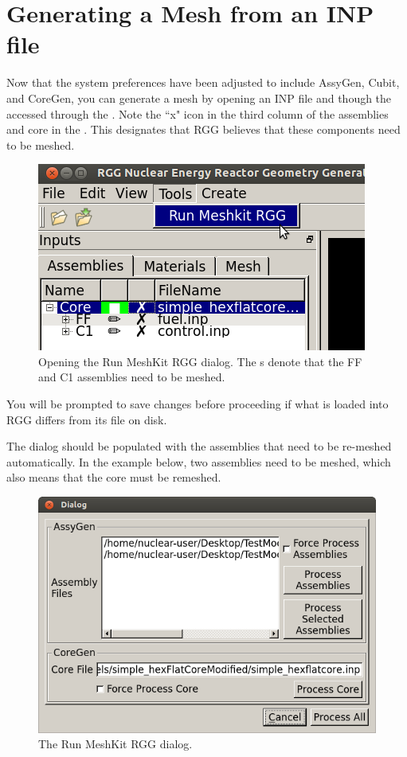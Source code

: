 \section{Generating a Mesh from an INP file}

Now that the system preferences have been adjusted to include AssyGen, Cubit, and CoreGen, you can generate a mesh by opening an INP file and though the  accessed through the .  Note the ``x" icon in the third column of the assemblies and core in the .  This designates that RGG believes that these components need to be meshed.

\begin{figure}[H]
	\begin{center}
		\includegraphics[width=0.5\linewidth]{Images/mesh-3.png}
		\caption{Opening the Run MeshKit RGG dialog.  The s denote that the FF and C1 assemblies need to be meshed.}
		\label{fig:Mesh3}
	\end{center}
\end{figure}

You will be prompted to save changes before proceeding if what is loaded into RGG differs from its file on disk.

The dialog should be populated with the assemblies that need to be re-meshed automatically.  In the example below, two assemblies need to be meshed, which also means that the core must be remeshed.

\begin{figure}[H]
	\begin{center}
		\includegraphics[width=0.5\linewidth]{Images/mesh-4.png}
		\caption{The Run MeshKit RGG dialog.}
		\label{fig:Mesh4}
	\end{center}
\end{figure}

